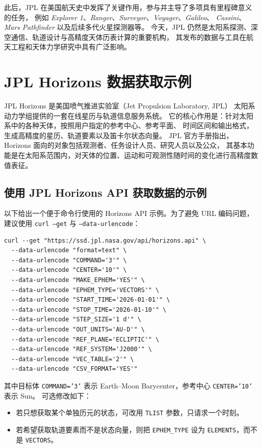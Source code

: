 此后，JPL 在美国航天史中发挥了关键作用，参与并主导了多项具有里程碑意义的任务，
例如 \emph{Explorer 1}、\emph{Ranger}、\emph{Surveyor}、\emph{Voyager}、\emph{Galileo}、
\emph{Cassini}、\emph{Mars Pathfinder} 以及后续多代火星探测器等。
今天，JPL 仍然是太阳系探测、深空通信、轨道设计与高精度天体历表计算的重要机构，
其发布的数据与工具在航天工程和天体力学研究中具有广泛影响。

\chapter{JPL Horizons 数据获取示例}

JPL Horizons 是美国喷气推进实验室（Jet Propulsion Laboratory, JPL）
太阳系动力学组提供的一套在线星历与轨道信息服务系统。
它的核心作用是：针对太阳系中的各种天体，按照用户指定的参考中心、参考平面、
时间区间和输出格式，生成高精度的星历、轨道要素以及笛卡尔状态向量。
JPL 官方手册指出，Horizons 面向的对象包括观测者、任务设计人员、研究人员以及公众，
其基本功能是在太阳系范围内，对天体的位置、运动和可观测性随时间的变化进行高精度数值表征。


\section{使用 JPL Horizons API 获取数据的示例}  

以下给出一个便于命令行使用的 Horizons API 示例。为了避免 URL 编码问题，建议使用 \texttt{curl --get} 与 \texttt{--data-urlencode}：

\begin{verbatim}
curl --get "https://ssd.jpl.nasa.gov/api/horizons.api" \
  --data-urlencode "format=text" \
  --data-urlencode "COMMAND='3'" \
  --data-urlencode "CENTER='10'" \
  --data-urlencode "MAKE_EPHEM='YES'" \
  --data-urlencode "EPHEM_TYPE='VECTORS'" \
  --data-urlencode "START_TIME='2026-01-01'" \
  --data-urlencode "STOP_TIME='2026-01-10'" \
  --data-urlencode "STEP_SIZE='1 d'" \
  --data-urlencode "OUT_UNITS='AU-D'" \
  --data-urlencode "REF_PLANE='ECLIPTIC'" \
  --data-urlencode "REF_SYSTEM='J2000'" \
  --data-urlencode "VEC_TABLE='2'" \
  --data-urlencode "CSV_FORMAT='YES'"
\end{verbatim}

其中目标体 \texttt{COMMAND='3'} 表示 Earth--Moon Barycenter，参考中心 \texttt{CENTER='10'} 表示 Sun。
可选修改如下：
\begin{itemize}[leftmargin=1.5em]
  \item 若只想获取某个单独历元的状态，可改用 \texttt{TLIST} 参数，只请求一个时刻。
  \item 若希望获取轨道要素而不是状态向量，则把 \texttt{EPHEM\_TYPE} 设为 \texttt{ELEMENTS}，而不是 \texttt{VECTORS}。
\end{itemize}

